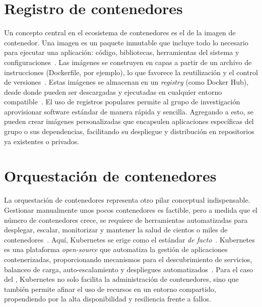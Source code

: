\section{Registro de contenedores}
\noindent
Un concepto central en el ecosistema de contenedores es el de la imagen de contenedor. Una imagen es un paquete inmutable que incluye todo lo necesario para ejecutar una aplicación: código, bibliotecas, herramientas del sistema y configuraciones~\citep{straesser2023empirical}. Las imágenes se construyen en capas a partir de un archivo de instrucciones (Dockerfile, por ejemplo), lo que favorece la reutilización y el control de versiones~\citep{dahlmanns2023secrets}. Estas imágenes se almacenan en un \textit{registry} (como Docker Hub), desde donde pueden ser descargadas y ejecutadas en cualquier entorno compatible~\citep{anwar2018improving}. El uso de registros populares permite al grupo de investigación aprovisionar software estándar de manera rápida y sencilla. Agregando a esto, se pueden crear imágenes personalizadas que encapsulen aplicaciones específicas del grupo o sus dependencias, facilitando su despliegue y distribución en repositorios ya existentes o privados.

\section{Orquestación de contenedores}
\noindent
La orquestación de contenedores representa otro pilar conceptual indispensable. Gestionar manualmente unos pocos contenedores es factible, pero a medida que el número de contenedores crece, se requiere de herramientas automatizadas para desplegar, escalar, monitorizar y mantener la salud de cientos o miles de contenedores~\citep{al2019container}. Aquí, Kubernetes se erige como el estándar \textit{de facto}~\citep{zhou2021container}. Kubernetes es una plataforma \textit{open-source} que automatiza la gestión de aplicaciones contenerizadas, proporcionando mecanismos para el descubrimiento de servicios, balanceo de carga, auto-escalamiento y despliegues automatizados~\citep{carrion2022kubernetes}. Para el caso del \GRID, Kubernetes no solo facilita la administración de contenedores, sino que también permite afinar el uso de recursos en un entorno compartido, propendiendo por la alta disponibilidad y resiliencia frente a fallos.

